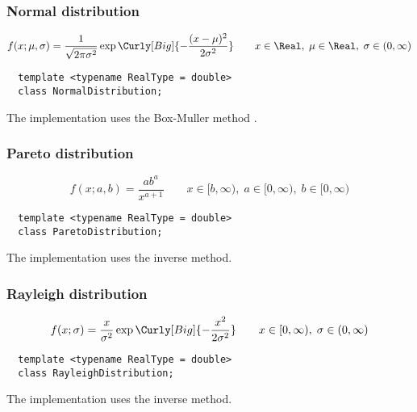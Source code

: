 \subsubsection{Normal distribution}

\begin{equation*}
  f(x;\mu,\sigma) =
  \frac{1}{\sqrt{2\pi\sigma^2}}
  \exp\Curly[Big]{-\frac{(x-\mu)^2}{2\sigma^2}} \qquad
  x \in \Real,\; \mu \in \Real,\; \sigma \in (0, \infty)
\end{equation*}
\begin{Verbatim}
  template <typename RealType = double>
  class NormalDistribution;
\end{Verbatim}
The implementation uses the Box-Muller method \cite{Box:1958hv}.

\subsubsection{Pareto distribution}

\begin{equation*}
  f(x;a,b) = \frac{a b^a}{x^{a + 1}} \qquad
  x \in [b, \infty),\; a \in [0, \infty),\; b \in [0, \infty)
\end{equation*}
\begin{Verbatim}
  template <typename RealType = double>
  class ParetoDistribution;
\end{Verbatim}
The implementation uses the inverse method.

\subsubsection{Rayleigh distribution}

\begin{equation*}
  f(x;\sigma) =
  \frac{x}{\sigma^2}\exp\Curly[Big]{-\frac{x^2}{2\sigma^2}} \qquad
  x \in [0, \infty),\; \sigma \in (0, \infty)
\end{equation*}
\begin{Verbatim}
  template <typename RealType = double>
  class RayleighDistribution;
\end{Verbatim}
The implementation uses the inverse method.

